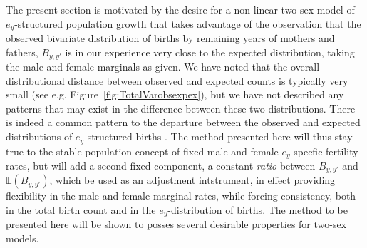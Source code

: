 
The present section is motivated by the desire for a non-linear two-sex model of
$e_y$-structured population growth that takes advantage of the observation that
the observed bivariate distribution of births by remaining years of mothers 
and fathers, $B_{y,y'}$ is in our experience very close to the expected
distribution, taking the male and female marginals as given. We have noted 
that the overall distributional distance
between observed and expected counts is typically very small (see e.g.
Figure~\ref{fig:TotalVarobsexpex}), but we have not described any patterns that
may exist in the difference between these two distributions. There is indeed a
common pattern to the departure between the observed and expected distributions
of $e_y$ structured births . The
method presented here will thus stay true to the stable population concept
 of fixed male and female $e_y$-specfic fertility rates, but will add a second
 fixed component, a constant \textit{ratio} between $B_{y,y'}$ and
 $\mathbb{E}(B_{y,y'})$, which be used as an adjustment intstrument, in effect
 providing flexibility in the male and female marginal rates, while forcing
 consistency, both in the total birth count and in the $e_y$-distribution of
 births. The method to be presented here will be shown to posses
 several desirable properties for two-sex models.
 
 



